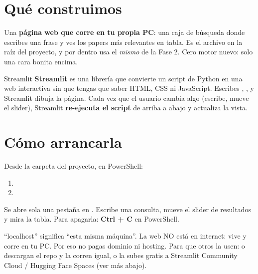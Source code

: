 \documentclass[11pt,a4paper]{article}
\begin{document}

\section{Qué construimos}

Una \textbf{página web que corre en tu propia PC}: una caja de búsqueda donde escribes una
frase y ves los papers más relevantes en tabla. Es el archivo  en la raíz del
proyecto, y por dentro usa el \emph{mismo}  de la Fase 2. Cero motor
nuevo: solo una cara bonita encima.

\begin{concepto}{Streamlit}
\textbf{Streamlit} es una librería que convierte un script de Python en una web interactiva
sin que tengas que saber HTML, CSS ni JavaScript. Escribes ,
,  y Streamlit dibuja la página. Cada
vez que el usuario cambia algo (escribe, mueve el slider), Streamlit \textbf{re-ejecuta el
script} de arriba a abajo y actualiza la vista.
\end{concepto}

\section{Cómo arrancarla}

\begin{practica}
Desde la carpeta del proyecto, en PowerShell:
\begin{enumerate}
  \item {}
  \item {}
\end{enumerate}
Se abre sola una pestaña en . Escribe una consulta, mueve el
slider de resultados y mira la tabla. Para apagarla: \textbf{Ctrl + C} en PowerShell.
\end{practica}

\begin{ojo}
``localhost'' significa ``esta misma máquina''. La web NO está en internet: vive y corre en tu
PC. Por eso no pagas dominio ni hosting. Para que otros la usen: o descargan el repo y la corren
igual, o la subes gratis a Streamlit Community Cloud / Hugging Face Spaces (ver más abajo).
\end{ojo}
\end{document}
